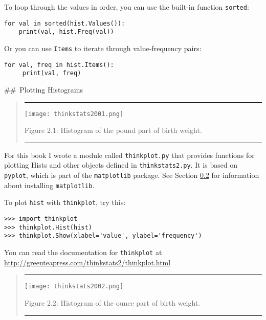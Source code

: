 \documentclass[]{book}
\begin{document}
To loop through the values in order, you
can use the built-in function \texttt{sorted}:

\begin{verbatim}
for val in sorted(hist.Values()):
    print(val, hist.Freq(val))
\end{verbatim}

Or you can use \texttt{Items} to iterate through
value-frequency pairs:

\begin{verbatim}
for val, freq in hist.Items():
     print(val, freq)
\end{verbatim}

\#\#~Plotting Histograms

\begin{quote}
\begin{center}\rule{0.5\linewidth}{\linethickness}\end{center}

\texttt{[image: thinkstats2001.png]}

Figure 2.1: Histogram of the pound part of birth weight.

\protect\hypertarget{first_wgt_lb_hist}{}{}

\begin{center}\rule{0.5\linewidth}{\linethickness}\end{center}
\end{quote}

For this book I wrote a module called
\texttt{thinkplot.py} that provides functions for plotting Hists and other objects defined in \texttt{thinkstats2.py}.
It is based on \texttt{pyplot}, which is part of the \texttt{matplotlib} package. See
Section \href{thinkstats2001.html\#code}{0.2} for information about installing \texttt{matplotlib}.

To plot \texttt{hist} with \texttt{thinkplot}, try this:

\begin{verbatim}
>>> import thinkplot
>>> thinkplot.Hist(hist)
>>> thinkplot.Show(xlabel='value', ylabel='frequency')
\end{verbatim}

You can read the documentation for \texttt{thinkplot} at \url{http://greenteapress.com/thinkstats2/thinkplot.html}

\begin{quote}
\begin{center}\rule{0.5\linewidth}{\linethickness}\end{center}

\texttt{[image: thinkstats2002.png]}

Figure 2.2: Histogram of the ounce part of birth weight.

\protect\hypertarget{first_wgt_oz_hist}{}{}

\begin{center}\rule{0.5\linewidth}{\linethickness}\end{center}
\end{quote}
\end{document}
